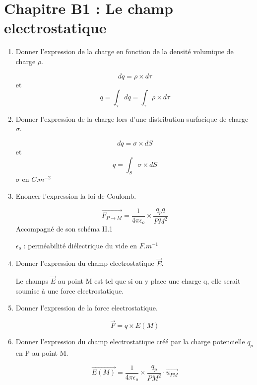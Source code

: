 \section*{\centering Chapitre B1 : Le champ electrostatique}
\begin{enumerate}[label=\arabic{enumi} - , left=0pt, itemsep=1em] %
    \item Donner l'expression de la charge en fonction de la densité volumique de charge $\rho$. \par
    \begin{solution}
          \[ dq = \rho \times d\tau \] et \[ q = \int_\tau dq = \int_\tau \rho \times d\tau \]
    \end{solution}

    \item Donner l'expression de la charge lors d'une distribution surfacique de charge $\sigma $. \par
    \begin{solution}
          \[ dq = \sigma \times dS \] et \[ q = \int_S \sigma \times dS \]
          $\sigma$ en $C.m^{-2}$
    \end{solution}

    \item Enoncer l'expression la loi de Coulomb. \par
    \begin{solution}
          \[ \overrightarrow{F_{P \to M}} = \frac{1}{4 \pi \epsilon_o} \times \frac{q_pq}{PM^2} \]
          Accompagné de son schéma II.1

           $\epsilon_o$ : perméabilité diélectrique du vide en $F.m^{-1}$
    \end{solution}

    \item Donner l'expression du champ electrostatique $\vec{E}$. \par
    \begin{solution}
          Le champs $\vec{E}$ au point M est tel que si on y place une charge q, elle serait soumise à une force electrostatique.
    \end{solution}

    \item Donner l'expression de la force electrostatique. \par
    \begin{solution}
          \[ \vec{F} = q \times E(M)\]
    \end{solution}

    \item Donner l'expression du champ electrostatique créé par la charge potencielle $q_p$ en P au point M. \par
    \begin{solution}
          \[ \vec{E(M)} = \frac{1}{4 \pi \epsilon_o} \times \frac{q_p}{PM^2} \cdot \vec{u_{PM}} \]
    \end{solution}


\end{enumerate}
